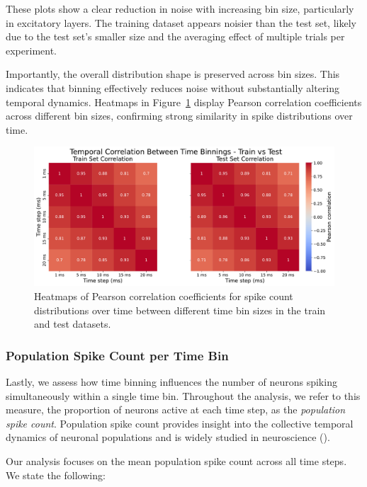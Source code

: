 These plots show a clear reduction in noise with increasing bin size, particularly in excitatory layers. The training dataset appears noisier than the test set, likely due to the test set's smaller size and the averaging effect of multiple trials per experiment.

Importantly, the overall distribution shape is preserved across bin sizes. This indicates that binning effectively reduces noise without substantially altering temporal dynamics. Heatmaps in Figure~\ref{fig:correlation_time_bin_size} display Pearson correlation coefficients across different bin sizes, confirming strong similarity in spike distributions over time.

\begin{figure}
    \centering
    \includegraphics[width=\linewidth]{img/plots/temporal_correlation_time_bin_size.pdf}
    \caption{Heatmaps of Pearson correlation coefficients for spike count distributions over time between different time bin sizes in the train and test datasets.}
    \label{fig:correlation_time_bin_size}
\end{figure}

\subsubsection{Population Spike Count per Time Bin}
\label{subsubsec:neuron_synchrony_binning}

Lastly, we assess how time binning influences the number of neurons spiking simultaneously within a single time bin. Throughout the analysis, we refer to this measure, the proportion of neurons active at each time step, as the \emph{population spike count}. Population spike count provides insight into the collective temporal dynamics of neuronal populations and is widely studied in neuroscience (\citet{Singer1999}).

Our analysis focuses on the mean population spike count across all time steps. We state the following:

